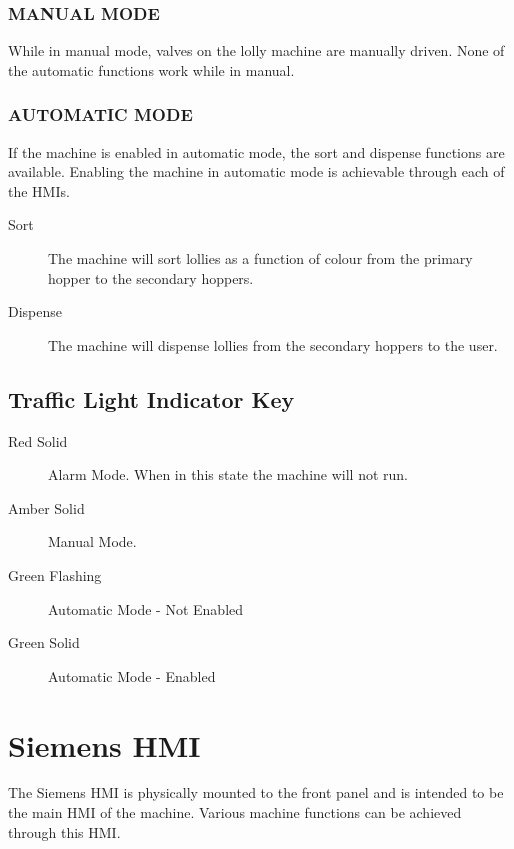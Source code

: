           \subsubsection{MANUAL MODE}
                While in manual mode, valves on the lolly machine are manually driven. None of the automatic functions work while in manual. 
                
            \subsubsection{AUTOMATIC MODE}
                If the machine is enabled in automatic mode, the sort and dispense functions are available. Enabling the machine in automatic mode is achievable through each of the HMIs.
                \begin{description}
                    \item[Sort] The machine will sort lollies as a function of colour from the primary hopper to the secondary hoppers.
                    \item[Dispense] The machine will dispense lollies from the secondary hoppers to the user.
                \end{description}
                
    \subsection{Traffic Light Indicator Key}          
        \begin{description}
            \item[Red Solid] Alarm Mode. When in this state the machine will not run. 
            \item[Amber Solid] Manual Mode.
            \item[Green Flashing]  Automatic Mode - Not Enabled
            \item[Green Solid]  Automatic Mode - Enabled
        \end{description}

    
    
\section{Siemens HMI}
    The Siemens HMI is physically mounted to the front panel and is intended to be the main HMI of the machine. Various machine functions can be achieved through this HMI.
    
